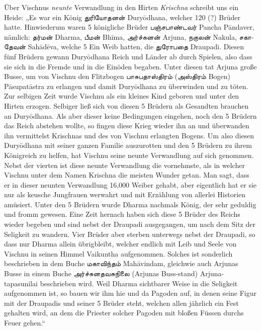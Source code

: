 \documentclass{article}
\newcommand{\TamilText}[1]{\texttamil{#1}}
\newcommand{\tam}[1]{\TamilText{#1}}
\begin{document}
Über Vischnus \emph{neunte} Verwandlung in den Hirten \emph{Krischna} schreibt uns ein Heide: „Es war ein König \tam{துரியோதனன்} Dury\={o}dhana, welcher 120 (?) Brüder hatte. Hinwiederum waren 5 königliche Brüder \tam{பஞ்சபாண்டவர்} Pancha P\={a}ndaver, nämlich: \tam{தர்மன்} Dharma, \tam{பீமன்} Bh\={i}ma, \tam{அர்ச்சுனன்} Arjuna, \tam{நகுலன்} Nakula, \tam{சகாதேவன்} Sah\={a}d\={e}va, welche 5 Ein Weib hatten, die \tam{துரோபதை} Draupadi. Diesen fünf Brüdern gewann Dury\={o}dhana Reich und Länder ab durch Spielen, also dass sie sich in die Fremde und in die Einöden begaben. Unter diesen tat Arjuna große Busse, um von Vischnu den Flitzbogen \tam{பாசுபதாஸ்திரம்} (\tam{அஸ்திரம்} Bogen) P\={a}supat\={a}stra zu erlangen und damit Dury\={o}dhana zu überwinden und zu töten. Zur selbigen Zeit wurde Vischnu als ein kleines Kind geboren und unter den Hirten erzogen. Selbiger ließ sich von diesen 5 Brüdern als Gesandten brauchen an Dury\={o}dhana. Als aber dieser keine Bedingungen eingehen, noch den 5 Brüdern das Reich abstehen wollte, so fingen diese Krieg wieder ihn an und überwanden ihn vermittelst Krischnas und des von Vischnu erlangten Bogens. Um also diesen Dury\={o}dhana mit seiner ganzen Familie auszurotten und den 5 Brüdern zu ihrem Königreich zu helfen, hat Vischnu seine neunte Verwandlung auf sich genommen. Nebst der vierten ist diese neunte Verwandlung die vornehmste, als in welcher Vischnu unter dem Namen Krischna die meisten Wunder getan. Man sagt, dass er in dieser neunten Verwandlung 16,000 Weiber gehabt, aber eigentlich hat er sie nur als keusche Jungfrauen werwahrt und mit Erzählung von allerlei Historien amüsiert. Unter den 5 Brüdern wurde Dharma nachmals König, der sehr geduldig und fromm gewesen. Eine Zeit hernach haben sich diese 5 Brüder des Reichs wieder begeben und sind nebst der Draupadi ausgegangen, um nach dem Sitz der Seligkeit zu wandern. Vier Brüder aber sterben unterwegs nebst der Draupadi, so dass nur Dharma allein übrigbleibt, welcher endlich mit Leib und Seele von Vischnu in seinen Himmel Vaikuntha aufgenommen. Solches ist sonderlich beschrieben in dem Buche \tam{மகாவிந்தம்} Mah\={a}vindam, gleichwie auch Arjunas Busse in einem Buche \tam{அர்ச்சுனதவசுநிலை} (Arjunas Buss-stand) Arjuna-tapasunilai beschrieben wird. Weil Dharma sichtbarer Weise in die Seligkeit aufgenommen ist, so bauen wir ihm hie und da Pagoden auf, in denen seine Figur mit der Draupadis und seiner 5 Brüder steht, welchen allen jährlich ein Fest gehalten wird, an dem die Priester solcher Pagoden mit bloßen Füssen durchs Feuer gehen.“
\end{document}
